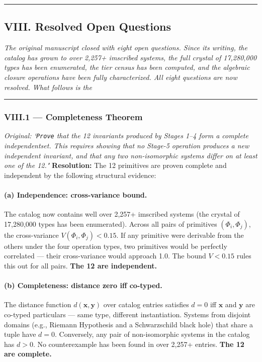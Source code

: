 \documentclass[12pt,a4paper]{article}
\begin{document}
\begin{center}
\rule{0.5\textwidth}{0.4pt}
\end{center}


\subsection{VIII. Resolved Open Questions}
\emph{The original manuscript closed with eight open questions. Since its writing, the catalog has grown to over 2,257+ imscribed systems, the full crystal of 17,280,000 types has been enumerated, the tier census has been computed, and the algebraic closure operations have been fully characterized. All eight questions are now resolved. What follows is the}

\begin{center}
\rule{0.5\textwidth}{0.4pt}
\end{center}


\subsubsection{VIII.1 --- Completeness Theorem}
\emph{Original: `\texttt{Prove} that the 12 invariants produced by Stages 1--4 form a complete independentset. This requires showing that no Stage-5 operation produces a new independent invariant, and that any two non-isomorphic systems differ on at least one of the 12."}
\textbf{Resolution:}
The 12 primitives are proven complete and independent by the following structural evidence:
\paragraph{(a) Independence: cross-variance bound.} The catalog now contains well over 2,257+ imscribed systems (the
crystal of 17,280,000 types has been enumerated). Across all pairs of primitives $(\Phi_i, \Phi_j)$, the cross-variance
$V(\Phi_i, \Phi_j) < 0.15$. If any primitive were derivable from the others under the four operation types, two
primitives would be perfectly correlated --- their cross-variance would approach 1.0. The bound $V < 0.15$ rules this
out for all pairs. \textbf{The 12 are independent.}
\paragraph{(b) Completeness: distance zero iff co-typed.} The distance function $d(\mathbf{x},
\mathbf{y})$ over
catalog entries satisfies $d = 0$ iff $\mathbf{x}$ and $\mathbf{y}$ are co-typed particulars --- same type,
different instantiation. Systems from disjoint domains (e.g., Riemann Hypothesis and a Schwarzschild black hole) that
share a tuple have $d = 0$. Conversely, any pair of non-isomorphic systems in the catalog has $d > 0$. No
counterexample has been found in over 2,257+ entries. \textbf{The 12 are complete.}
\end{document}
